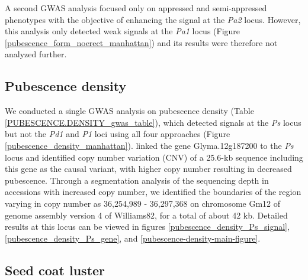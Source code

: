 A second GWAS analysis focused only on appressed and semi-appressed phenotypes
with the objective of enhancing the signal at the \emph{Pa2} locus. However,
this analysis only detected weak signals at the \emph{Pa1} locus (Figure
\ref{pubescence_form_noerect_manhattan}) and its results were therefore not
analyzed further.

\subsection*{Pubescence density}
\label{sv-gwas-pubescence-density}

We conducted a single GWAS analysis on pubescence density (Table
\ref{PUBESCENCE.DENSITY_gwas_table}), which detected signals at the \emph{Ps}
locus but not the \emph{Pd1} and \emph{P1} loci using all four approaches
(Figure \ref{pubescence_density_manhattan}). \cite{liu2020ps} linked the gene
Glyma.12g187200 to the \emph{Ps} locus and identified copy number variation
(CNV) of a 25.6-kb sequence including this gene as the causal variant, with
higher copy number resulting in decreased pubescence. Through a segmentation
analysis of the sequencing depth in accessions with increased copy number, we
identified the boundaries of the region varying in copy number as 36,254,989 -
36,297,368 on chromosome Gm12 of genome assembly version 4 of Williams82, for a
total of about 42 kb. Detailed results at this locus can be viewed in figures
\ref{pubescence_density_Ps_signal}, \ref{pubescence_density_Ps_gene}, and
\ref{pubescence-density-main-figure}.

\subsection*{Seed coat luster}
\label{sv-gwas-seed-coat-luster}

